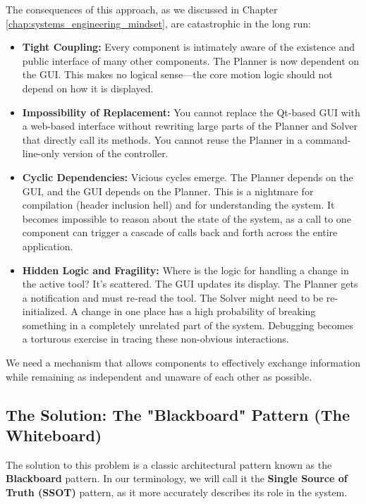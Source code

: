 The consequences of this approach, as we discussed in Chapter \ref{chap:systems_engineering_mindset}, are catastrophic in the long run:
\begin{itemize}
    \item \textbf{Tight Coupling:} Every component is intimately aware of the existence and public interface of many other components. The Planner is now dependent on the GUI. This makes no logical sense—the core motion logic should not depend on how it is displayed.
    \item \textbf{Impossibility of Replacement:} You cannot replace the Qt-based GUI with a web-based interface without rewriting large parts of the Planner and Solver that directly call its methods. You cannot reuse the Planner in a command-line-only version of the controller.
    \item \textbf{Cyclic Dependencies:} Vicious cycles emerge. The Planner depends on the GUI, and the GUI depends on the Planner. This is a nightmare for compilation (header inclusion hell) and for understanding the system. It becomes impossible to reason about the state of the system, as a call to one component can trigger a cascade of calls back and forth across the entire application.
    \item \textbf{Hidden Logic and Fragility:} Where is the logic for handling a change in the active tool? It's scattered. The GUI updates its display. The Planner gets a notification and must re-read the tool. The Solver might need to be re-initialized. A change in one place has a high probability of breaking something in a completely unrelated part of the system. Debugging becomes a torturous exercise in tracing these non-obvious interactions.
\end{itemize}

We need a mechanism that allows components to effectively exchange information while remaining as independent and unaware of each other as possible.



\subsection{The Solution: The "Blackboard" Pattern (The Whiteboard)}
\label{subsec:blackboard_pattern}

The solution to this problem is a classic architectural pattern known as the \textbf{Blackboard} pattern. In our terminology, we will call it the \textbf{Single Source of Truth (SSOT)} pattern, as it more accurately describes its role in the system.

